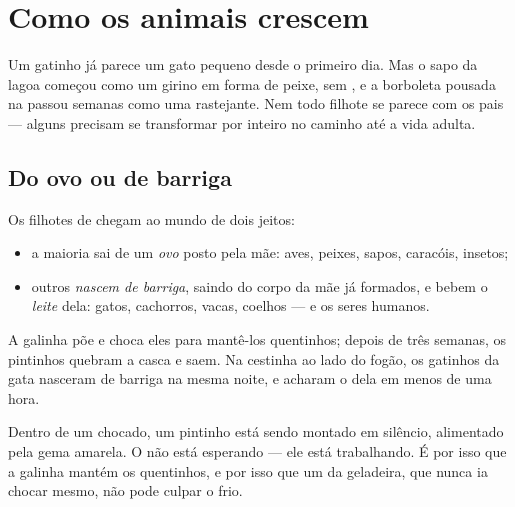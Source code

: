 \chapter{Como os animais crescem}\label{ch:g2:animals-grow-up}

Um gatinho já parece um gato pequeno desde o primeiro dia. Mas o
sapo da lagoa começou como um girino em forma de peixe, sem ,
e a borboleta pousada na  passou semanas como uma 
rastejante. Nem todo filhote se parece com os pais --- alguns
precisam se transformar por inteiro no caminho até a vida adulta.

\section{Do ovo ou de barriga}

\begin{definition}\label{def:g2:animals-grow-up:born}
Os filhotes de  chegam ao mundo de dois jeitos:
\begin{itemize}
  \item a maioria sai de um \emph{ovo} posto pela mãe:
        aves, peixes, sapos, caracóis, insetos;
  \item outros \emph{nascem de barriga},
        saindo do corpo da mãe já formados, e bebem o
        \emph{leite} dela: gatos, cachorros, vacas,
        coelhos --- e os seres humanos.
\end{itemize}
\end{definition}

\begin{example}\label{ex:g2:animals-grow-up:henhouse}
A galinha põe  e choca eles para mantê-los quentinhos; depois de
três semanas, os pintinhos quebram a casca e saem. Na cestinha ao
lado do fogão, os gatinhos da gata nasceram de barriga na mesma
noite, e acharam o  dela em menos de uma hora.
\end{example}

\begin{remark}\label{rem:g2:animals-grow-up:egg}
Dentro de um  chocado, um pintinho está sendo montado em silêncio,
alimentado pela gema amarela. O  não está esperando --- ele está
trabalhando. É por isso que a galinha mantém os  quentinhos, e
por isso que um  da geladeira, que nunca ia chocar mesmo, não
pode culpar o frio.
\end{remark}

